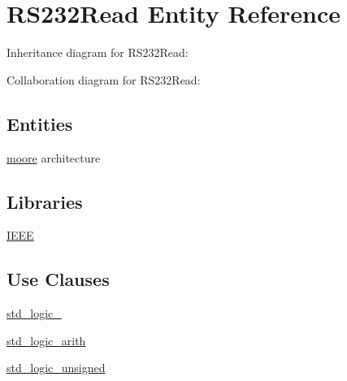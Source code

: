 \hypertarget{class_r_s232_read}{}\section{R\+S232\+Read Entity Reference}
\label{class_r_s232_read}


Inheritance diagram for R\+S232\+Read\+:


Collaboration diagram for R\+S232\+Read\+:
\subsection*{Entities}
\begin{DoxyCompactItemize}
\item 
\hyperlink{class_r_s232_read_1_1moore}{moore} architecture
\end{DoxyCompactItemize}
\subsection*{Libraries}
 \begin{DoxyCompactItemize}
\item 
\hyperlink{class_r_s232_read_ae4f03c286607f3181e16b9aa12d0c6d4}{I\+E\+E\+E} 
\end{DoxyCompactItemize}
\subsection*{Use Clauses}
 \begin{DoxyCompactItemize}
\item 
\hyperlink{class_r_s232_read_acd03516902501cd1c7296a98e22c6fcb}{std\+\_\+logic\+\_}   
\item 
\hyperlink{class_r_s232_read_a0f5ecc6613f63d07f7963a97b1b26095}{std\+\_\+logic\+\_\+arith}   
\item 
\hyperlink{class_r_s232_read_a598da929e807d58939b47499e8bc9fa8}{std\+\_\+logic\+\_\+unsigned}   
\end{DoxyCompactItemize}
